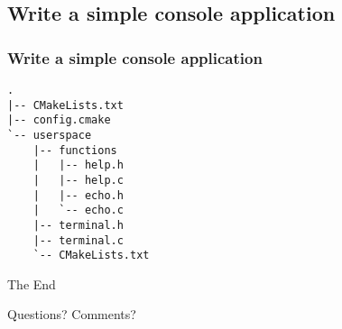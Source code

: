 \documentclass[
	11pt, %
]{beamer}
\newcommand{\ssft}[1]{\subsection{#1}\frametitle{#1}}
\begin{document}
\begin{frame}[fragile]
    \ssft{Write a simple console application}

    \begin{lstlisting}[style=CStyle]
.
|-- CMakeLists.txt
|-- config.cmake
`-- userspace
    |-- functions
    |   |-- help.h
    |   |-- help.c
    |   |-- echo.h
    |   `-- echo.c
    |-- terminal.h
    |-- terminal.c
    `-- CMakeLists.txt

\end{lstlisting}
\end{frame}


\begin{frame}[plain] %
	\begin{center}
		{\Huge The End}

		\bigskip\bigskip %

		{\LARGE Questions? Comments?}
	\end{center}
\end{frame}

\end{document}
